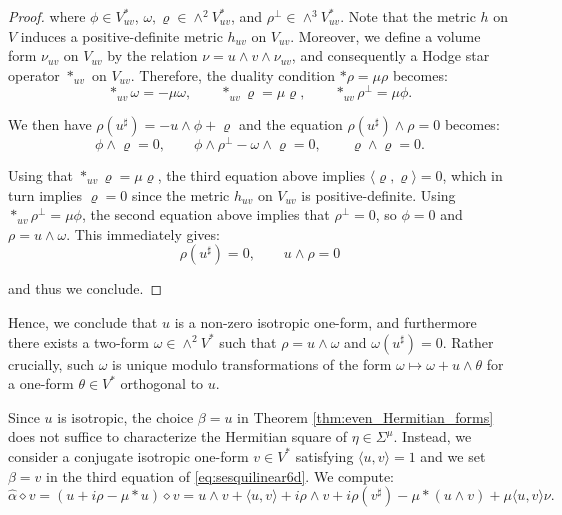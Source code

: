 \documentclass[10pt,a4paper,twoside,reqno]{amsart}
\theoremstyle{plain}
\theoremstyle{definition}
\theoremstyle{remark}
\newcommand{\escal}[1]{\langle#1\rangle}
\begin{document}
\begin{proof}
\noindent
where $\phi\in V_{uv}^*$, $\omega,\varrho\in\wedge^2V_{uv}^*$, and $\rho^\perp\in\wedge^3V_{uv}^*$. Note that the metric $h$ on $V$ induces a positive-definite metric $h_{uv}$ on $V_{uv}$. Moreover, we define a volume form $\nu_{uv}$ on $V_{uv}$ by the relation $\nu=u\wedge v\wedge \nu_{uv}$, and consequently a Hodge star operator $*_{uv}$ on $V_{uv}$. Therefore, the duality condition $*\rho=\mu\rho$ becomes:
\begin{equation*}
*_{uv}\omega=-\mu\omega,\qquad *_{uv}\varrho=\mu\varrho,\qquad *_{uv}\rho^\perp=\mu\phi.
\end{equation*}

\noindent
We then have $\rho(u^\sharp)=-u\wedge\phi+\varrho$ and the equation $\rho(u^\sharp)\wedge\rho=0$ becomes: $$\phi\wedge\varrho=0,\qquad \phi\wedge\rho^\perp-\omega\wedge\varrho=0,\qquad \varrho\wedge\varrho=0.$$

Using that $*_{uv}\varrho=\mu\varrho$, the third equation above implies $\escal{\varrho,\varrho}=0$, which in turn implies $\varrho=0$ since the metric $h_{uv}$ on $V_{uv}$ is positive-definite. Using $*_{uv}\rho^\perp=\mu\phi$, the second equation above implies that $\rho^\perp=0$, so $\phi=0$ and $\rho=u\wedge\omega$. This immediately gives:
\begin{equation*}
\rho(u^\sharp)=0,\qquad u\wedge\rho=0
\end{equation*}

\noindent
and thus we conclude.
\end{proof}

\noindent
Hence, we conclude that $u$ is a non-zero isotropic one-form, and furthermore there exists a two-form $\omega\in \wedge^2 V^{\ast}$ such that $\rho = u \wedge \omega$ and $\omega(u^\sharp) = 0$. Rather crucially, such $\omega$ is unique modulo transformations of the form $\omega \mapsto \omega + u \wedge \theta$ for a one-form $\theta \in V^{\ast}$ orthogonal to $u$.\medskip

Since $u$ is isotropic, the choice $\beta = u$ in Theorem \ref{thm:even_Hermitian_forms} does not suffice to characterize the Hermitian square of $\eta\in\Sigma^{\mu}$. Instead, we consider a conjugate isotropic one-form $v\in V^{\ast}$ satisfying $\langle u , v\rangle =1$ and we set $\beta = v$ in the third equation of \eqref{eq:sesquilinear6d}. We compute: 
\begin{equation*}
\widehat{\alpha}\diamond v=(u+i\rho-\mu*u)\diamond v=u\wedge v+\escal{u,v}+i\rho\wedge v+i\rho(v^\sharp)-\mu*(u\wedge v)+\mu\escal{u,v}\nu.   
\end{equation*}
\end{document}
